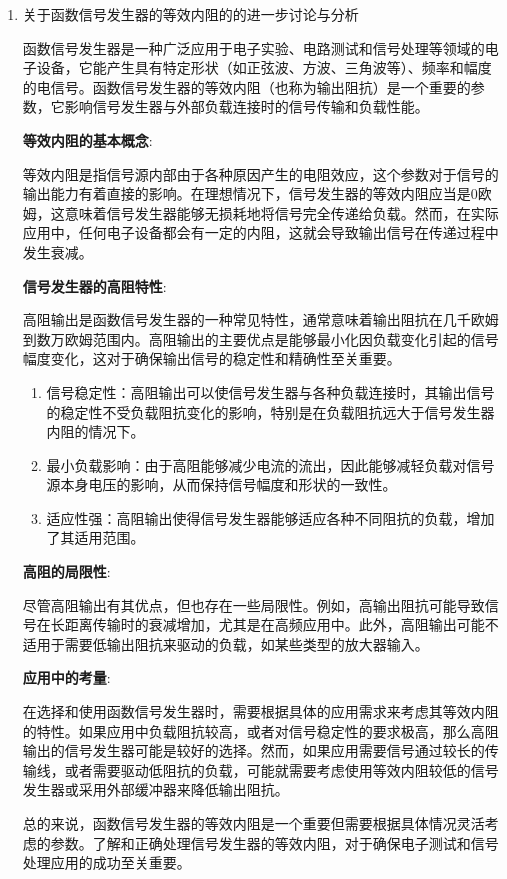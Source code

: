 \documentclass[dvipsnames, svgnames,a4paper,11pt]{article}
\begin{document}
\begin{enumerate}
\begin{enumerate}
		\end{enumerate}
		\item 关于函数信号发生器的等效内阻的的进一步讨论与分析
		
		
		函数信号发生器是一种广泛应用于电子实验、电路测试和信号处理等领域的电子设备，它能产生具有特定形状（如正弦波、方波、三角波等）、频率和幅度的电信号。函数信号发生器的等效内阻（也称为输出阻抗）是一个重要的参数，它影响信号发生器与外部负载连接时的信号传输和负载性能。
		
		\textbf{等效内阻的基本概念}:
		
		等效内阻是指信号源内部由于各种原因产生的电阻效应，这个参数对于信号的输出能力有着直接的影响。在理想情况下，信号发生器的等效内阻应当是0欧姆，这意味着信号发生器能够无损耗地将信号完全传递给负载。然而，在实际应用中，任何电子设备都会有一定的内阻，这就会导致输出信号在传递过程中发生衰减。
		
		\textbf{信号发生器的高阻特性}:
		
		高阻输出是函数信号发生器的一种常见特性，通常意味着输出阻抗在几千欧姆到数万欧姆范围内。高阻输出的主要优点是能够最小化因负载变化引起的信号幅度变化，这对于确保输出信号的稳定性和精确性至关重要。
		
		\begin{enumerate}
			\item 信号稳定性：高阻输出可以使信号发生器与各种负载连接时，其输出信号的稳定性不受负载阻抗变化的影响，特别是在负载阻抗远大于信号发生器内阻的情况下。
			\item 最小负载影响：由于高阻能够减少电流的流出，因此能够减轻负载对信号源本身电压的影响，从而保持信号幅度和形状的一致性。
			\item 适应性强：高阻输出使得信号发生器能够适应各种不同阻抗的负载，增加了其适用范围。
		\end{enumerate}

		\textbf{高阻的局限性}:
		
		尽管高阻输出有其优点，但也存在一些局限性。例如，高输出阻抗可能导致信号在长距离传输时的衰减增加，尤其是在高频应用中。此外，高阻输出可能不适用于需要低输出阻抗来驱动的负载，如某些类型的放大器输入。
		
		\textbf{应用中的考量}:
		
		在选择和使用函数信号发生器时，需要根据具体的应用需求来考虑其等效内阻的特性。如果应用中负载阻抗较高，或者对信号稳定性的要求极高，那么高阻输出的信号发生器可能是较好的选择。然而，如果应用需要信号通过较长的传输线，或者需要驱动低阻抗的负载，可能就需要考虑使用等效内阻较低的信号发生器或采用外部缓冲器来降低输出阻抗。
		
		总的来说，函数信号发生器的等效内阻是一个重要但需要根据具体情况灵活考虑的参数。了解和正确处理信号发生器的等效内阻，对于确保电子测试和信号处理应用的成功至关重要。
		
	\end{enumerate}
	
\end{document}
